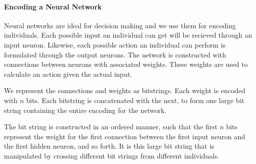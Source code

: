 \paragraph{Encoding a Neural Network}


Neural networks are ideal for decision making and we use them for encoding individuals. Each possible input an individual can get will be recieved through an input neuron. Likewise, each possible action an individual can perform is formulated through the output neurons. The network is constructed with connections between neurons with associated weights. These weights are used to calculate an action given the actual input.

We represent the connections and weights as bitstrings. Each weight is encoded with $n$ bits. Each bitstring is concatenated with the next, to form one large bit string containing the entire encoding for the network.

The bit string is constructed in an ordered manner, such that the first $n$ bits represent the weight for the first connection between the first input neuron and the first hidden neuron, and so forth. It is this large bit string that is manipulated by crossing different bit strings from different individuals.



